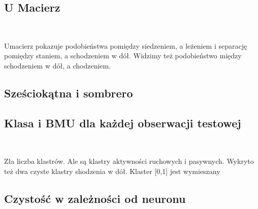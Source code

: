 \documentclass[11pt]{article}
\begin{document}
    \hypertarget{u-macierz}{%
\subsection{U Macierz}\label{u-macierz}}

            
        
    \begin{center}
    \end{center}
    { \hspace*{\fill} \\}
    
    Umacierz pokazuje podobieństwa pomiędzy siedzeniem, a leżeniem i
separację pomiędzy staniem, a schodzeniem w dół. Widzimy też
podobieństwo między schodzeniem w dół, a chodzeniem.

    \hypertarget{szeux15bciokux105tna-i-sombrero}{%
\subsection{Sześciokątna i
sombrero}\label{szeux15bciokux105tna-i-sombrero}}

    \hypertarget{klasa-i-bmu-dla-kaux17cdej-obserwacji-testowej}{%
\subsection{Klasa i BMU dla każdej obserwacji
testowej}\label{klasa-i-bmu-dla-kaux17cdej-obserwacji-testowej}}

            
        
    \begin{center}
    \end{center}
    { \hspace*{\fill} \\}
    
    Zła liczba klastrów. Ale są klastry aktywności ruchowych i pasywnych.
Wykryto też dwa czyste klastry shodzenia w dół. Klaster {[}0,1{]} jest
wymieszany

    \hypertarget{czystoux15bux107-w-zaleux17cnoux15bci-od-neuronu}{%
\subsection{Czystość w zależności od
neuronu}\label{czystoux15bux107-w-zaleux17cnoux15bci-od-neuronu}}
\end{document}

